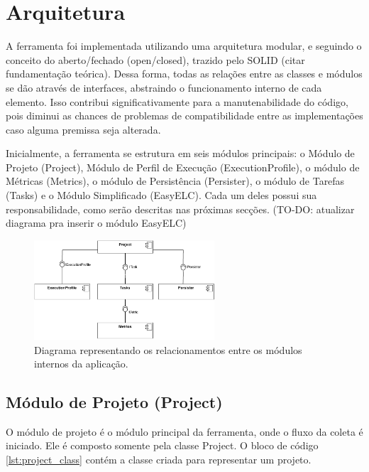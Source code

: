 \documentclass[12pt]{tcc}
\begin{document}
\section{Arquitetura}
\label{cap:arquitetura}

A ferramenta foi implementada utilizando uma arquitetura modular, e seguindo o conceito do aberto/fechado (open/closed), trazido pelo SOLID (citar fundamentação teórica). Dessa forma, todas as relações entre as classes e módulos se dão através de interfaces, abstraindo o funcionamento interno de cada elemento. Isso contribui significativamente para a manutenabilidade do código, pois diminui as chances de problemas de compatibilidade entre as implementações caso alguma premissa seja alterada.

Inicialmente, a ferramenta se estrutura em seis módulos principais: o Módulo de Projeto (Project), Módulo de Perfil de Execução (ExecutionProfile), o módulo de Métricas (Metrics), o módulo de Persistência (Persister), o módulo de Tarefas (Tasks) e o Módulo Simplificado (EasyELC). Cada um deles possui sua responsabilidade, como serão descritas nas próximas secções. (TO-DO: atualizar diagrama pra inserir o módulo EasyELC)


\begin{figure}[!ht]
	\centering
	\includegraphics[width=0.6\textwidth]{figures/diagramaarquiteturaelchupacabra.pdf}
	\caption{Diagrama representando os relacionamentos entre os módulos internos da aplicação.}
	\label{fig:diagrama-arquitetura}
\end{figure}

\subsection{Módulo de Projeto (Project)}
\label{subsection:modulo-project}

O módulo de projeto é o módulo principal da ferramenta, onde o fluxo da coleta é iniciado. Ele é composto somente pela classe Project. O bloco de código \ref{lst:project_class} contém a classe criada para representar um projeto.
\end{document}
